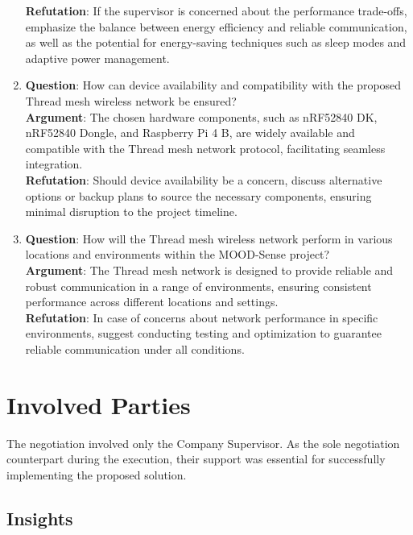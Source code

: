 \begin{enumerate}
    \textbf{Refutation}: If the supervisor is concerned about the performance trade-offs, emphasize the balance between energy efficiency and reliable communication, as well as the potential for energy-saving techniques such as sleep modes and adaptive power management.
    \item \textbf{Question}: How can device availability and compatibility with the proposed Thread mesh wireless network be ensured?\\
    \textbf{Argument}: The chosen hardware components, such as nRF52840 DK, nRF52840 Dongle, and Raspberry Pi 4 B, are widely available and compatible with the Thread mesh network protocol, facilitating seamless integration.\\
    \textbf{Refutation}: Should device availability be a concern, discuss alternative options or backup plans to source the necessary components, ensuring minimal disruption to the project timeline.
    \item \textbf{Question}: How will the Thread mesh wireless network perform in various locations and environments within the MOOD-Sense project?\\
    \textbf{Argument}: The Thread mesh network is designed to provide reliable and robust communication in a range of environments, ensuring consistent performance across different locations and settings.\\
    \textbf{Refutation}: In case of concerns about network performance in specific environments, suggest conducting testing and optimization to guarantee reliable communication under all conditions.\\
\end{enumerate}


\section{Involved Parties}

The negotiation involved only the Company Supervisor. As the sole negotiation counterpart during the execution, their support was essential for successfully implementing the proposed solution.

\subsection*{Insights}

